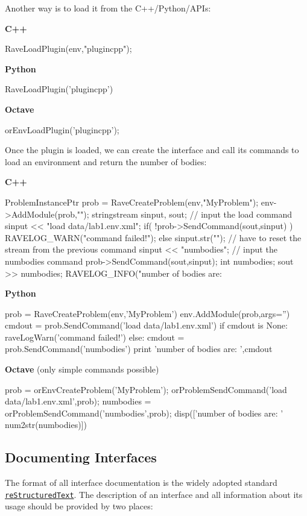 \begin{DoxyItemize}
\item Another way is to load it from the C++/Python/APIs:\par
 {\bfseries C++} 
\begin{DoxyCode}
RaveLoadPlugin(env,"plugincpp");
\end{DoxyCode}
 {\bfseries Python} \begin{DoxyVerb}
RaveLoadPlugin('plugincpp')
\end{DoxyVerb}
 {\bfseries Octave} \begin{DoxyVerb}
orEnvLoadPlugin('plugincpp');
\end{DoxyVerb}

\end{DoxyItemize}

Once the plugin is loaded, we can create the interface and call its commands to load an environment and return the number of bodies:

{\bfseries C++} 
\begin{DoxyCode}
ProblemInstancePtr prob = RaveCreateProblem(env,"MyProblem");
env->AddModule(prob,"");
stringstream sinput, sout;
// input the load command
sinput << "load data/lab1.env.xml";
if( !prob->SendCommand(sout,sinput) ) {
    RAVELOG_WARN("command failed!\n");
}
else {
    sinput.str(""); // have to reset the stream from the previous command
    sinput << "numbodies"; // input the numbodies command
    prob->SendCommand(sout,sinput);
    int numbodies;
    sout >> numbodies;
    RAVELOG_INFO("number of bodies are: %
}
\end{DoxyCode}


{\bfseries Python} \begin{DoxyVerb}
prob = RaveCreateProblem(env,'MyProblem')
env.AddModule(prob,args='')
cmdout = prob.SendCommand('load data/lab1.env.xml')
if cmdout is None:
    raveLogWarn('command failed!')
else:
    cmdout = prob.SendCommand('numbodies')
    print 'number of bodies are: ',cmdout
\end{DoxyVerb}


{\bfseries Octave} (only simple commands possible) \begin{DoxyVerb}
prob = orEnvCreateProblem('MyProblem');
orProblemSendCommand('load data/lab1.env.xml',prob);
numbodies = orProblemSendCommand('numbodies',prob);
disp(['number of bodies are: ' num2str(numbodies)])
\end{DoxyVerb}
\hypertarget{writing__plugins_writing_plugins_doc}{}\subsection{Documenting Interfaces}\label{writing__plugins_writing_plugins_doc}
The format of all interface documentation is the widely adopted standard \href{http://docutils.sourceforge.net/rst.html}{\tt reStructuredText}. The description of an interface and all information about its usage should be provided by two places:


